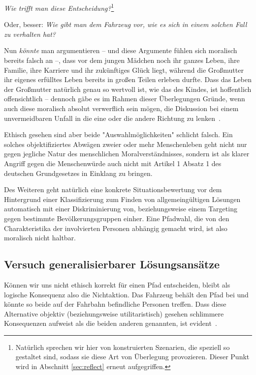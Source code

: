 \documentclass[twocolumn, german]{tum-article}
\begin{document}
\emph{Wie trifft man diese Entscheidung?}\footnote{Natürlich sprechen wir hier von konstruierten Szenarien, die speziell so gestaltet sind, sodass sie diese Art von Überlegung provozieren. Dieser Punkt wird in Abschnitt \vref{sec:reflect} erneut aufgegriffen.\label{fn:constructed}}

Oder, besser: \emph{Wie gibt man dem Fahrzeug vor, wie es sich in einem solchen Fall zu verhalten hat?}

Nun \emph{könnte} man argumentieren -- und diese Argumente fühlen sich moralisch bereits falsch an --, dass vor dem jungen Mädchen noch ihr ganzes Leben, ihre Familie, ihre Karriere und ihr zukünftiges Glück liegt, während die Großmutter ihr eigenes erfülltes Leben bereits in großen Teilen erleben durfte.
Dass das Leben der Großmutter natürlich genau so wertvoll ist, wie das des Kindes, ist hoffentlich offensichtlich -- dennoch gäbe es im Rahmen dieser Überlegungen Gründe, wenn auch diese moralisch absolut verwerflich sein mögen, die Diskussion bei einem unvermeidbaren Unfall in die eine oder die andere Richtung zu lenken~\cite[S. 69f.]{maurer-autonomous}.

Ethisch gesehen sind aber beide "Auswahlmöglichkeiten" schlicht falsch.
Ein solches objektifiziertes Abwägen zweier oder mehr Menschenleben geht nicht nur gegen jegliche Natur des menschlichen Moralverständnisses, sondern ist als klarer Angriff gegen die Menschenwürde auch nicht mit Artikel 1 Absatz 1 des deutschen Grundgesetzes in Einklang zu bringen.

Des Weiteren geht natürlich eine konkrete Situationsbewertung vor dem Hintergrund einer Klassifizierung zum Finden von allgemeingültigen Lösungen automatisch mit einer Diskriminierung von, beziehungsweise einem Targeting gegen bestimmte Bevölkerungsgruppen einher.
Eine Pfadwahl, die von den Charakteristika der involvierten Personen abhängig gemacht wird, ist also moralisch nicht haltbar.


\subsection{Versuch generalisierbarer Lösungsansätze}
Können wir uns nicht ethisch korrekt für einen Pfad entscheiden, bleibt als logische Konsequenz also die Nichtaktion.
Das Fahrzeug behält den Pfad bei und könnte so beide auf der Fahrbahn befindliche Personen treffen.
Dass diese Alternative objektiv (beziehungsweise utilitaristisch) gesehen schlimmere Konsequenzen aufweist als die beiden anderen genannten, ist evident~\cite[S. 70]{maurer-autonomous}.
\end{document}
